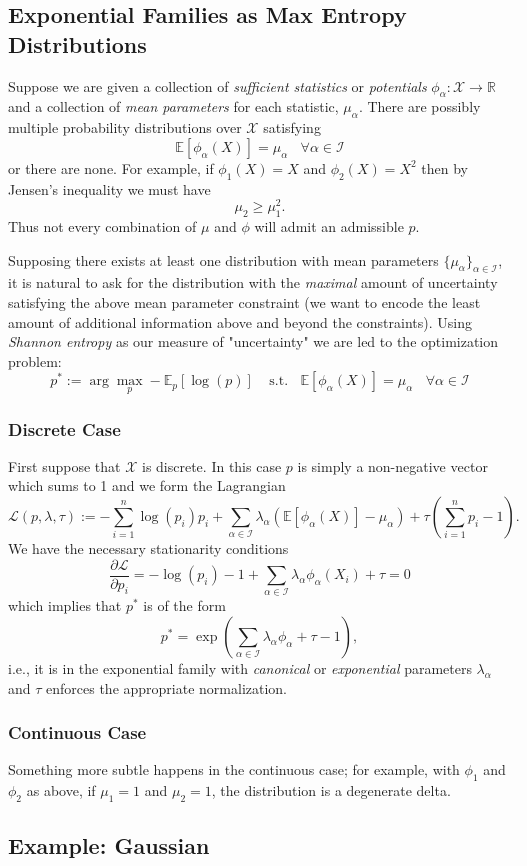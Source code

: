 \subsection{Exponential Families as Max Entropy Distributions}

Suppose we are given a collection of \emph{sufficient statistics} or \emph{potentials} $\phi_\alpha: \mathcal{X} \rightarrow \mathbb{R}$ and a collection of \emph{mean parameters} for each statistic, $\mu_\alpha$.  There are possibly multiple probability distributions over $\mathcal{X}$ satisfying
$$
\mathbb{E}[\phi_\alpha(X)] = \mu_\alpha \ \ \ \ \forall \alpha\in\mathcal{I}
$$
or there are none.  For example, if $\phi_1(X) = X$ and $\phi_2(X) = X^2$ then by Jensen's inequality we must have
$$
\mu_2 \geq \mu_1 ^2.
$$
Thus not every combination of $\mu$ and $\phi$ will admit an admissible $p$.

Supposing there exists at least one distribution with mean parameters $\{\mu_\alpha\}_{\alpha\in\mathcal{I}}$, it is natural to ask for the distribution with the \emph{maximal} amount of uncertainty satisfying the above mean parameter constraint (we want to encode the least amount of additional information above and beyond the constraints).  Using \emph{Shannon entropy} as our measure of "uncertainty" we are led to the optimization problem:
$$
p^* := \arg\max_{p} -\mathbb{E}_p[\log(p)] \ \ \ \ \ \text{s.t.}\ \ \ \  \mathbb{E}[\phi_\alpha(X)] = \mu_\alpha \ \ \ \ \forall \alpha\in\mathcal{I}
$$
\subsubsection{Discrete Case}
First suppose that $\mathcal{X}$ is discrete.  In this case $p$ is simply a non-negative vector which sums to 1 and we form the Lagrangian
$$
\mathcal{L}(p, \lambda, \tau) := - \sum_{i=1}^n\log(p_i)p_i + \sum_{\alpha\in\mathcal{I}} \lambda_\alpha \left(\mathbb{E}[\phi_\alpha(X)] - \mu_\alpha\right) + \tau (\sum_{i=1}^n p_i - 1).
$$
We have the necessary stationarity conditions
$$
\frac{\partial \mathcal{L}}{\partial p_i} = -\log(p_i) - 1 + \sum_{\alpha\in\mathcal{I}} \lambda_\alpha\phi_\alpha(X_i) + \tau= 0
$$
which implies that $p^*$ is of the form
$$
p^* = \exp\left(\sum_{\alpha\in\mathcal{I}} \lambda_\alpha\phi_\alpha + \tau - 1\right),
$$
i.e., it is in the exponential family with \emph{canonical} or \emph{exponential} parameters $\lambda_\alpha$ and $\tau$ enforces the appropriate normalization.


\subsubsection{Continuous Case}

Something more subtle happens in the continuous case; for example, with $\phi_1$ and $\phi_2$ as above, if $\mu_1 = 1$ and $\mu_2 =1$, the distribution is a degenerate delta.

\subsection{Example: Gaussian}